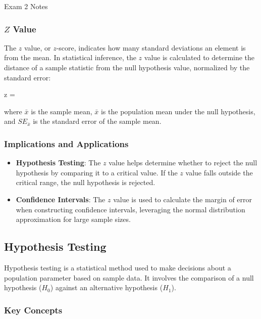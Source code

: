 \begin{examnotes}{Exam 2 Notes}
    \subsubsection*{$Z$ Value}
    
    The $z$ value, or $z$-score, indicates how many standard deviations an element is from the mean. In statistical inference, the $z$ value is calculated to determine the distance of a sample statistic 
    from the null hypothesis value, normalized by the standard error:
    
    \begin{center}
        \begin{highlightbox}
            z = 
        \end{highlightbox}
    \end{center}
    where $\bar{x}$ is the sample mean, $\bar{x}$ is the population mean under the null hypothesis, and $SE_{\bar{x}}$ is the standard error of the sample mean.
    
    \subsubsection*{Implications and Applications}
    
    \begin{itemize}
        \item \textbf{Hypothesis Testing}: The $z$ value helps determine whether to reject the null hypothesis by comparing it to a critical value. If the $z$ value falls outside the critical range, 
        the null hypothesis is rejected.
        \item \textbf{Confidence Intervals}: The $z$ value is used to calculate the margin of error when constructing confidence intervals, leveraging the normal distribution approximation for large sample sizes.
    \end{itemize}

    \subsection*{Hypothesis Testing}

    Hypothesis testing is a statistical method used to make decisions about a population parameter based on sample data. It involves the comparison of a null hypothesis ($H_0$) against an alternative 
    hypothesis ($H_1$).
    
    \subsubsection*{Key Concepts}
    

\end{examnotes}
